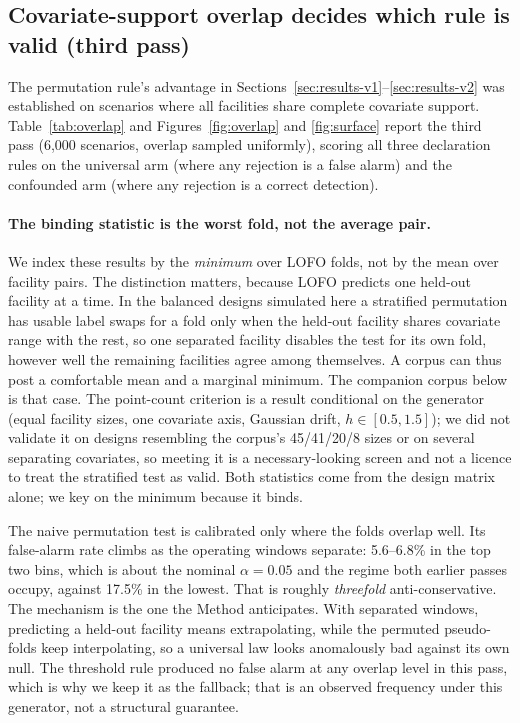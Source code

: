 \documentclass[journal=dce]{CUP-JNL-DTM}%
\begin{document}
\subsection{Covariate-support overlap decides which rule is valid (third pass)}
\label{sec:results-v3}

The permutation rule's advantage in Sections~\ref{sec:results-v1}--\ref{sec:results-v2} was established on scenarios where all facilities share complete covariate support. Table~\ref{tab:overlap} and Figures~\ref{fig:overlap} and \ref{fig:surface} report the third pass (6,000 scenarios, overlap sampled uniformly), scoring all three declaration rules on the universal arm (where any rejection is a false alarm) and the confounded arm (where any rejection is a correct detection).

\paragraph{The binding statistic is the worst fold, not the average pair.} We index these results by the \emph{minimum} over LOFO folds, not by the mean over facility pairs. The distinction matters, because LOFO predicts one held-out facility at a time. In the balanced designs simulated here a stratified permutation has usable label swaps for a fold only when the held-out facility shares covariate range with the rest, so one separated facility disables the test for its own fold, however well the remaining facilities agree among themselves. A corpus can thus post a comfortable mean and a marginal minimum. The companion corpus below is that case. The point-count criterion is a result conditional on the generator (equal facility sizes, one covariate axis, Gaussian drift, $h\in[0.5,1.5]$); we did not validate it on designs resembling the corpus's 45/41/20/8 sizes or on several separating covariates, so meeting it is a necessary-looking screen and not a licence to treat the stratified test as valid. Both statistics come from the design matrix alone; we key on the minimum because it binds.

The naive permutation test is calibrated only where the folds overlap well. Its false-alarm rate climbs as the operating windows separate: 5.6--6.8\% in the top two bins, which is about the nominal $\alpha=0.05$ and the regime both earlier passes occupy, against 17.5\% in the lowest. That is roughly \emph{threefold} anti-conservative. The mechanism is the one the Method anticipates. With separated windows, predicting a held-out facility means extrapolating, while the permuted pseudo-folds keep interpolating, so a universal law looks anomalously bad against its own null. The threshold rule produced no false alarm at any overlap level in this pass, which is why we keep it as the fallback; that is an observed frequency under this generator, not a structural guarantee.
\end{document}
